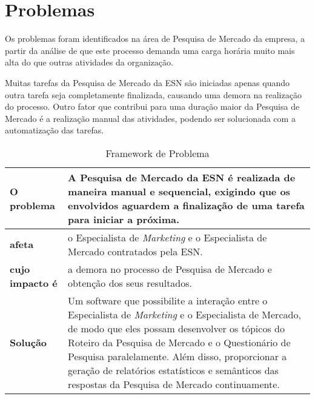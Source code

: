 \section{Problemas}

	Os problemas foram identificados na área de Pesquisa de Mercado da empresa, a partir da análise de que este processo demanda uma carga horária muito mais alta do que outras atividades da organização.

	Muitas tarefas da Pesquisa de Mercado da ESN são iniciadas apenas quando outra tarefa seja completamente finalizada, causando uma demora na realização do processo. Outro fator que contribui para uma duração maior da Pesquisa de Mercado é a realização manual das atividades, podendo ser solucionada com a automatização das tarefas.

	\vspace*{0.5cm}

	\begin{table}[htbp]
		\caption{Framework de Problema}
		\begin{tabular}{|l|p{13cm}|}
			\hline
			\textbf{O problema} & A Pesquisa de Mercado da ESN é realizada de maneira manual e sequencial, exigindo que os envolvidos aguardem a finalização de uma tarefa para iniciar a próxima. \\ \hline

			\textbf{afeta} & o Especialista de \textit{Marketing} e o Especialista de Mercado contratados pela ESN. \\ \hline

			\textbf{cujo impacto é} & a demora no processo de Pesquisa de Mercado e obtenção dos seus resultados. \\ \hline

			\textbf{Solução} & Um software que possibilite a interação entre o Especialista de \textit{Marketing} e o Especialista de Mercado, de modo que eles possam desenvolver os tópicos do Roteiro da Pesquisa de Mercado e o Questionário de Pesquisa paralelamente. Além disso, proporcionar a geração de relatórios estatísticos e semânticos das respostas da Pesquisa de Mercado continuamente. \\ \hline
		\end{tabular}
	\label{Framework de Problema}
	\end{table}